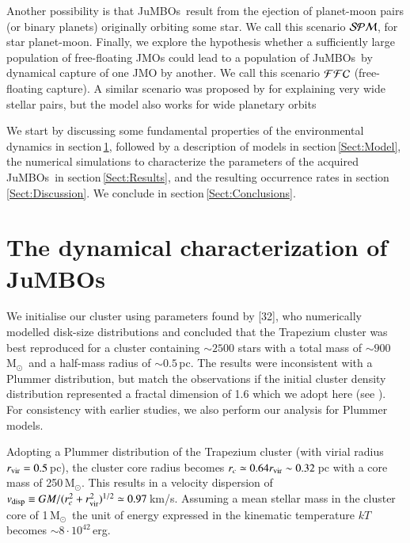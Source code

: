 \documentclass[submission,phys]{lib/SciPost}
\newcommand{\MSun}{\mbox{$\mathrm{{M}}_\odot$}}
\newcommand{\jumbos}{\mbox{JuMBOs}}
\begin{document}
Another possibility is that \jumbos\, result from the ejection of planet-moon
pairs (or binary planets) originally orbiting some star.  We call this 
scenario ${\cal SPM}$, for star planet-moon.
Finally, we explore the hypothesis whether a sufficiently large
population of free-floating JMOs could lead to a
population of \jumbos\, by dynamical capture of one JMO by another.
We call this scenario ${\cal FFC}$ (free-floating capture). A similar
scenario was proposed by \cite{2010MNRAS.404.1835K} for explaining
very wide stellar pairs, but the model also works for
wide planetary orbits \cite{2012ApJ...750...83P,2018MNRAS.473.1589G}

We start by discussing some fundamental properties of the
environmental dynamics in section\,\ref{Sect:Characterize}, followed
by a description of models in section\,\ref{Sect:Model}, the numerical
simulations to characterize the parameters of the acquired \jumbos\,
in section\,\ref{Sect:Results}, and the resulting occurrence rates in
section\,\ref{Sect:Discussion}. We conclude in
section\,\ref{Sect:Conclusions}.

\section{The dynamical characterization of \jumbos}\label{Sect:Characterize}

We initialise our cluster using parameters found by [32], who
numerically modelled disk-size distributions and concluded that the
Trapezium cluster was best reproduced for a cluster containing $\sim
2500$ stars with a total mass of $\sim 900$\,\MSun\, and a half-mass
radius of $\sim 0.5$\,pc. The results were inconsistent with a Plummer
\cite{1911MNRAS..71..460P} distribution, but match the observations if
the initial cluster density distribution represented a fractal
dimension of 1.6 which we adopt here (see \cite{2004A&A...413..929G}).
For consistency with earlier studies, we also perform our analysis for
Plummer models.

Adopting a Plummer distribution of the Trapezium cluster (with virial
radius $r_{\rm vir} = 0.5$\,pc), the cluster core radius becomes $r_c \simeq
0.64r_{\rm vir} \sim 0.32$\,pc with a core mass of 250\,\MSun. This results 
in a velocity dispersion of $v_{\rm disp} \equiv GM/(r_c^2 +
r_{\rm vir}^2)^{1/2} \simeq 0.97$\,km/s. Assuming a mean stellar mass in
the cluster core of 1\,\MSun\, the unit of energy expressed in the
kinematic temperature $kT$ becomes $\sim 8 \cdot 10^{42}$\,erg.
\end{document}

